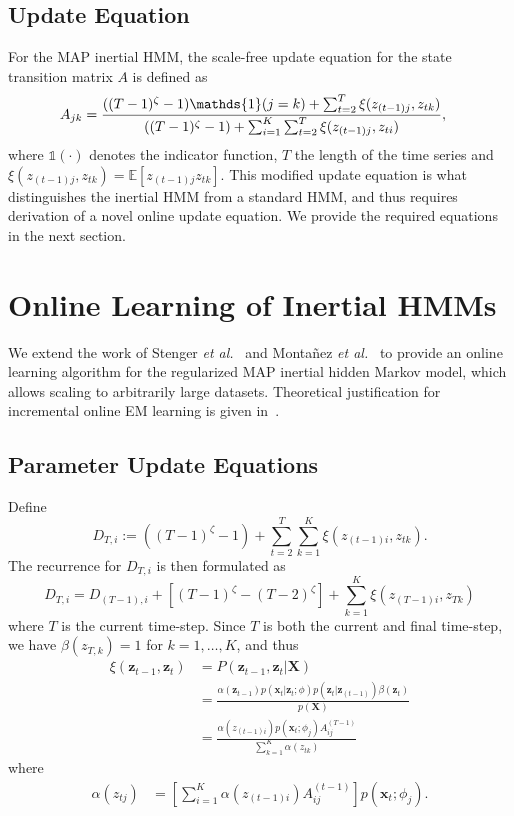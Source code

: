 \documentclass{article}
\begin{document}
\subsection{Update Equation}

For the MAP inertial HMM, the scale-free update equation for the state transition matrix $A$ is defined as
\begin{align}\label{eq:SCALE-FREE-MAP}
  \setlength{\abovedisplayskip}{0pt}
  \setlength{\belowdisplayskip}{0pt}
    A_{jk} &= \frac{((T - 1)^{\zeta}-1){\mathds{1}(j = k)} + \sum_{t=2}^{T} \xi(z_{(t-1)j}, z_{tk})}   
    {((T - 1)^{\zeta} - 1) + \sum_{i=1}^{K}\sum_{t=2}^{T} \xi(z_{(t-1)j}, z_{ti})},
\end{align}
where $\mathds{1}(\cdot)$ denotes the indicator function, $T$ the length of the time series and $\xi(z_{(t-1)j}, z_{tk})=\mathds{E}[z_{(t-1)j}z_{tk}]$. This modified update equation is what distinguishes the inertial HMM from a standard HMM, and thus requires derivation of a novel online update equation. We provide the required equations in the next section.

\section{Online Learning of Inertial HMMs}

We extend the work of Stenger \emph{et
al.}~ and Monta\~nez \emph{et
al.}~ to provide an online learning algorithm for the
regularized MAP inertial hidden Markov model, which allows scaling to arbitrarily large
datasets. Theoretical justification for incremental online EM learning is given
in~\cite{Neal:1999:VEA:308574.308679}.

\subsection{Parameter Update Equations}

Define 
\[
   D_{T,i} := ((T-1)^\zeta -1) + \sum_{t=2}^{T}\sum_{k=1}^{K} \xi(z_{(t-1)i}, z_{tk}).
\]
The recurrence for $D_{T,i}$ is then formulated as
\begin{equation*}
    D_{T,i} = D_{(T-1), i} + [(T-1)^\zeta - (T-2)^\zeta] + \sum_{k=1}^{K}
    \xi(z_{(T-1)i}, z_{Tk})
\end{equation*}
where $T$ is the current time-step. Since $T$ is both the current and final time-step, we have $\beta(z_{T,k}) = 1$ for $k = 1, \ldots, K$, and thus
\begin{align*}
    \xi(\mathbf{z}_{t-1}, \mathbf{z}_{t}) 
            &= P(\mathbf{z}_{t-1}, \mathbf{z}_{t} | \mathbf{X}) \\
            &= \frac{\alpha(\mathbf{z}_{t-1})p(\mathbf{x}_t|\mathbf{z}_t; \phi)p(\mathbf{z}_{t}|\mathbf{z}_{(t-1)})\beta(\mathbf{z}_t)}{p(\mathbf{X})} \\
            &= \frac{\alpha(z_{(t-1)i})p(\mathbf{x}_t; \phi_j)A_{ij}^{(T-1)}}{\sum_{k=1}^{K}\alpha(z_{tk})}
\end{align*}
where
\begin{align*}
    \alpha(z_{tj}) &= \left[\sum_{i=1}^{K} \alpha(z_{(t-1)i})A_{ij}^{(t-1)}\right]p(\mathbf{x}_t; \phi_j).
\end{align*}
\end{document}
